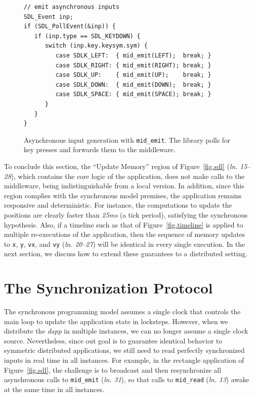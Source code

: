 \documentclass[sigplan,screen]{acmart}
\newcommand{\lin}[1]{(\emph{ln. #1}\xspace)}
\newcommand{\dapp}{\emph{dapp}\xspace}
\begin{document}
\begin{figure}[t]
{\scriptsize
\begin{verbatim}
// emit asynchronous inputs
SDL_Event inp;
if (SDL_PollEvent(&inp)) {
   if (inp.type == SDL_KEYDOWN) {
      switch (inp.key.keysym.sym) {
         case SDLK_LEFT:  { mid_emit(LEFT);  break; }
         case SDLK_RIGHT: { mid_emit(RIGHT); break; }
         case SDLK_UP:    { mid_emit(UP);    break; }
         case SDLK_DOWN:  { mid_emit(DOWN);  break; }
         case SDLK_SPACE: { mid_emit(SPACE); break; }
      }
   }
}
\end{verbatim}
}
  \caption{
    \label{fig.input}
    Asynchronous input generation with \texttt{mid\_emit}.
    The library polls for key presses and forwards them to the middleware.
  }
\end{figure}

To conclude this section, the ``Update Memory'' region of Figure~\ref{fig.sdl}
\lin{15--28}, which contains the core logic of the application, does not make
calls to the
middleware, being indistinguishable from a local version.
In addition, since this region complies with the synchronous model premises,
the application remains responsive and deterministic.
For instance, the computations to update the positions are clearly faster than
\emph{25ms} (a tick period), satisfying the synchronous hypothesis.
Also, if a timeline such as that of Figure~\ref{fig.timeline} is applied to
multiple re-executions of the application, then the sequence of memory updates
to \texttt{x}, \texttt{y}, \texttt{vx}, and \texttt{vy} \lin{20--27} will be
identical in every single execution.
In the next section, we discuss how to extend these guarantees to a distributed
setting.

\section{The Synchronization Protocol}
\label{sec.gals}

The synchronous programming model assumes a single clock that controls the main
loop to update the application state in locksteps.
However, when we distribute the \dapp in multiple instances, we can no longer
assume a single clock source.
%
Nevertheless, since out goal is to guarantee identical behavior to symmetric
distributed applications, we still need to read perfectly synchronized inputs
in real time in all instances.
For example, in the rectangle application of Figure~\ref{fig.sdl}, the
challenge is to broadcast and then resynchronize all asynchronous calls to
\texttt{mid\_emit} \lin{31}, so that calls to \texttt{mid\_read} \lin{13} awake
at the same time in all instances.
\end{document}
